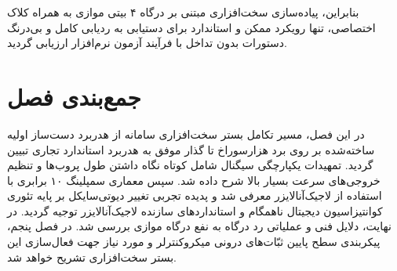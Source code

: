 بنابراین، پیاده‌سازی سخت‌افزاری مبتنی بر درگاه ۴ بیتی موازی  به همراه کلاک اختصاصی، تنها رویکرد ممکن و استاندارد برای دستیابی به ردیابی کامل و بی‌درنگ دستورات بدون تداخل با فرآیند آزمون نرم‌افزار ارزیابی گردید.

\section{جمع‌بندی فصل}
در این فصل، مسیر تکامل بستر سخت‌افزاری سامانه از هدربرد دست‌ساز اولیه ساخته‌شده بر روی برد هزارسوراخ تا گذار موفق به هدربرد استاندارد تجاری  تبیین گردید. تمهیدات یکپارچگی سیگنال شامل کوتاه نگاه داشتن طول پروب‌ها و تنظیم خروجی‌های سرعت بسیار بالا شرح داده شد. سپس معماری سمپلینگ ۱۰ برابری با استفاده از لاجیک‌آنالایزر  معرفی شد و پدیده تجربی تغییر دیوتی‌سایکل بر پایه تئوری کوانتیزاسیون دیجیتال ناهمگام و استانداردهای سازنده لاجیک‌آنالایزر توجیه گردید. در نهایت، دلایل فنی و عملیاتی رد درگاه  به نفع درگاه موازی  بررسی شد. در فصل پنجم، پیکربندی سطح پایین ثبّات‌های درونی میکروکنترلر و  مورد نیاز جهت فعال‌سازی این بستر سخت‌افزاری تشریح خواهد شد.
